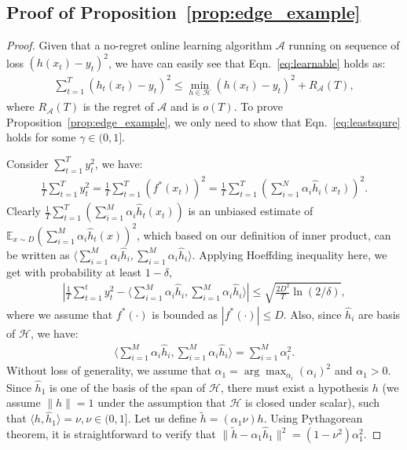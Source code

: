 \subsection{Proof of Proposition~\ref{prop:edge_example}}
\begin{proof}
Given that a no-regret online learning algorithm $\mathcal{A}$ running on sequence of loss $(h(x_t) - y_t)^2$, we have can easily see that Eqn.~\ref{eq:learnable} holds as:
\begin{align}
\label{eq:no_regret}
\sum_{t=1}^T(h_t(x_t) - y_t)^2\leq \min_{h\in\mathcal{H}}(h(x_t) - y_t)^2 + R_{\mathcal{A}}(T), 
\end{align}where $R_{\mathcal{A}}(T)$ is the regret of $\mathcal{A}$ and is $o(T)$. To prove Proposition~\ref{prop:edge_example}, we only need to show that Eqn.~\ref{eq:leastsqure} holds for some $\gamma\in(0,1]$. 

Consider $\sum_{t=1}^T y_t^2$, we have:
\begin{align}
\frac{1}{T}\sum_{t=1}^T y_t^2 = \frac{1}{T}\sum_{t=1}^T (f^*(x_t))^2 =  \frac{1}{T}\sum_{t=1}^T (\sum_{i=1}^N\alpha_i \hat{h}_i(x_t))^2.
\end{align} Clearly $\frac{1}{T}\sum_{t=1}^T (\sum_{i=1}^M\alpha_i\hat{h}_t(x_t))$ is an unbiased estimate of $\mathbb{E}_{x\sim D}(\sum_{i=1}^M\alpha_i \hat{h}_t(x))^2$, which based on our definition of inner product, can be written as $\langle \sum_{i=1}^M \alpha_i\hat{h}_i, \sum_{i=1}^M\alpha_i\hat{h}_i \rangle$. Applying Hoeffding inequality here, we get with probability at least $1-\delta$,
\begin{align}
\label{eq:high_prob_1}
|\frac{1}{T}\sum_{t=1}^t y_t^2 - \langle\sum_{i=1}^M \alpha_i\hat{h}_i, \sum_{i=1}^M\alpha_i\hat{h}_i\rangle| \leq \sqrt{\frac{2D^2}{T}\ln(2/\delta)},
\end{align} where we assume that $f^*(\cdot)$ is bounded as $|f^*(\cdot)|\leq D$. Also, since $\hat{h}_i$ are basis of $\mathcal{H}$, we have:
\begin{align}
\langle \sum_{i=1}^M \alpha_i\hat{h}_i, \sum_{i=1}^M\alpha_i\hat{h}_i \rangle = \sum_{i=1}^M \alpha_i^2. 
\end{align}
Without loss of generality, we assume that $\alpha_1 = \arg\max_{\alpha_i} (\alpha_i)^2$ and $\alpha_1 > 0$. Since $\hat{h}_1$ is one of the basis of the span of $\mathcal{H}$, there must exist a hypothesis ${h}$ (we assume $\|{h}\| = 1$ under the assumption that $\mathcal{H}$ is closed under scalar), such that $\langle{h}, \hat{h}_1\rangle = \nu, \nu\in (0,1]$. Let us define $\tilde{h} = (\alpha_1\nu) h$. Using Pythagorean theorem, it is straightforward to verify that $\|\tilde{h} - \alpha_1\hat{h}_1\|^2 = (1-\nu^2)\alpha_1^2$.


\end{proof}
